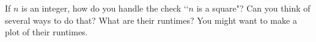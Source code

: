   If $n$ is an integer, how do you handle the check \lq\lq $n$ is a square"?
  Can you think of several ways to do that?
  What are their runtimes? You might want to make a plot of their runtimes.
